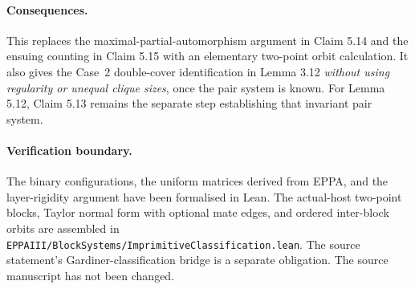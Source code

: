 \documentclass[11pt,a4paper]{article}
\begin{document}
\paragraph{Consequences.}
This replaces the maximal-partial-automorphism
argument in Claim 5.14 and the ensuing counting
in Claim 5.15 with an elementary two-point
orbit calculation. It also gives the Case~2
double-cover identification in Lemma 3.12
\emph{without using regularity or unequal
clique sizes}, once the pair system is known.
For Lemma 5.12, Claim 5.13 remains the separate
step establishing that invariant pair system.

\paragraph{Verification boundary.}
The binary configurations, the uniform matrices
derived from EPPA, and the layer-rigidity
argument have been formalised in Lean.
The actual-host two-point blocks, Taylor
normal form with optional mate edges, and
ordered inter-block orbits are assembled in
\texttt{EPPAIII/BlockSystems/ImprimitiveClassification.lean}.
The source statement's Gardiner-classification
bridge is a separate obligation. The source manuscript has
not been changed.
\end{document}
